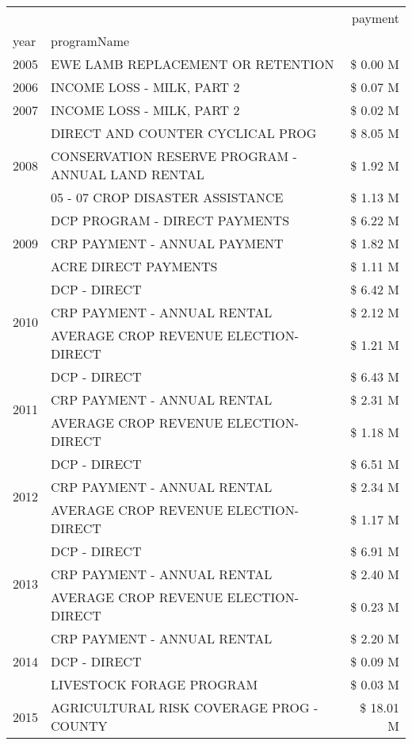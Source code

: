 \begin{tabular}{llr}
\toprule
 &  & payment \\
year & programName &  \\
\midrule
2005 & EWE LAMB REPLACEMENT OR RETENTION & \$ 0.00 M \\
\cline{1-3}
2006 & INCOME LOSS - MILK, PART 2 & \$ 0.07 M \\
\cline{1-3}
2007 & INCOME LOSS - MILK, PART 2 & \$ 0.02 M \\
\cline{1-3}
\multirow[t]{3}{*}{2008} & DIRECT AND COUNTER CYCLICAL PROG & \$ 8.05 M \\
 & CONSERVATION RESERVE PROGRAM - ANNUAL LAND RENTAL & \$ 1.92 M \\
 & 05 - 07 CROP DISASTER ASSISTANCE & \$ 1.13 M \\
\cline{1-3}
\multirow[t]{3}{*}{2009} & DCP PROGRAM - DIRECT PAYMENTS & \$ 6.22 M \\
 & CRP PAYMENT - ANNUAL PAYMENT & \$ 1.82 M \\
 & ACRE DIRECT PAYMENTS & \$ 1.11 M \\
\cline{1-3}
\multirow[t]{3}{*}{2010} & DCP - DIRECT & \$ 6.42 M \\
 & CRP PAYMENT - ANNUAL RENTAL & \$ 2.12 M \\
 & AVERAGE CROP REVENUE ELECTION-DIRECT & \$ 1.21 M \\
\cline{1-3}
\multirow[t]{3}{*}{2011} & DCP - DIRECT & \$ 6.43 M \\
 & CRP PAYMENT - ANNUAL RENTAL & \$ 2.31 M \\
 & AVERAGE CROP REVENUE ELECTION-DIRECT & \$ 1.18 M \\
\cline{1-3}
\multirow[t]{3}{*}{2012} & DCP - DIRECT & \$ 6.51 M \\
 & CRP PAYMENT - ANNUAL RENTAL & \$ 2.34 M \\
 & AVERAGE CROP REVENUE ELECTION-DIRECT & \$ 1.17 M \\
\cline{1-3}
\multirow[t]{3}{*}{2013} & DCP - DIRECT & \$ 6.91 M \\
 & CRP PAYMENT - ANNUAL RENTAL & \$ 2.40 M \\
 & AVERAGE CROP REVENUE ELECTION-DIRECT & \$ 0.23 M \\
\cline{1-3}
\multirow[t]{3}{*}{2014} & CRP PAYMENT - ANNUAL RENTAL & \$ 2.20 M \\
 & DCP - DIRECT & \$ 0.09 M \\
 & LIVESTOCK FORAGE PROGRAM & \$ 0.03 M \\
\cline{1-3}
\multirow[t]{3}{*}{2015} & AGRICULTURAL RISK COVERAGE PROG - COUNTY & \$ 18.01 M \\

\end{tabular}
